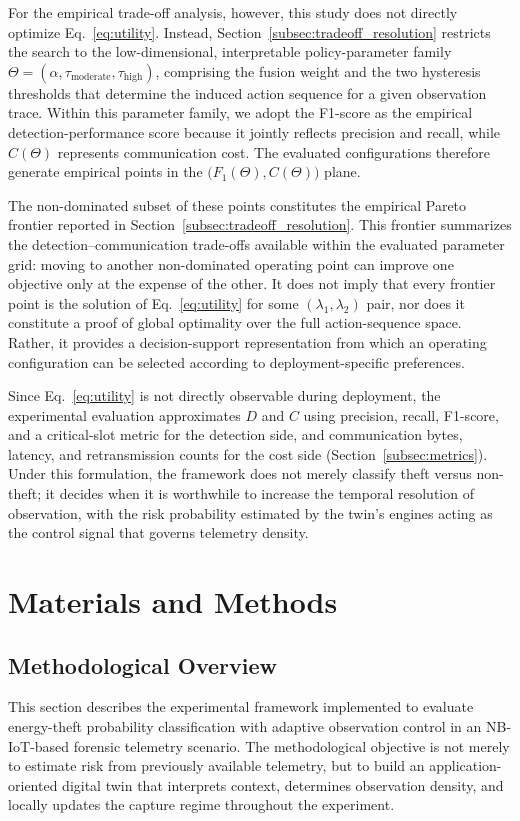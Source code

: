 \documentclass{ieeeaccess}
\begin{document}
For the empirical trade-off analysis, however, this study does not directly optimize Eq.~\eqref{eq:utility}. Instead, Section~\ref{subsec:tradeoff_resolution} restricts the search to the low-dimensional, interpretable policy-parameter family $\Theta=(\alpha,\tau_{\mathrm{moderate}},\tau_{\mathrm{high}})$, comprising the fusion weight and the two hysteresis thresholds that determine the induced action sequence for a given observation trace. Within this parameter family, we adopt the F1-score as the empirical detection-performance score because it jointly reflects precision and recall, while $C(\Theta)$ represents communication cost. The evaluated configurations therefore generate empirical points in the $\bigl(F_1(\Theta),C(\Theta)\bigr)$ plane.

The non-dominated subset of these points constitutes the empirical Pareto frontier reported in Section~\ref{subsec:tradeoff_resolution}. This frontier summarizes the detection--communication trade-offs available within the evaluated parameter grid: moving to another non-dominated operating point can improve one objective only at the expense of the other. It does not imply that every frontier point is the solution of Eq.~\eqref{eq:utility} for some $(\lambda_1,\lambda_2)$ pair, nor does it constitute a proof of global optimality over the full action-sequence space. Rather, it provides a decision-support representation from which an operating configuration can be selected according to deployment-specific preferences.

Since Eq.~\eqref{eq:utility} is not directly observable during deployment, the experimental evaluation approximates $D$ and $C$ using precision, recall, F1-score, and a critical-slot metric for the detection side, and communication bytes, latency, and retransmission counts for the cost side (Section~\ref{subsec:metrics}). Under this formulation, the framework does not merely classify theft versus non-theft; it decides when it is worthwhile to increase the temporal resolution of observation, with the risk probability estimated by the twin's engines acting as the control signal that governs telemetry density.

\section{Materials and Methods}
\label{sec:Materials_Methods}
\subsection{Methodological Overview}
This section describes the experimental framework implemented to evaluate energy-theft probability classification with adaptive observation control in an NB-IoT-based forensic telemetry scenario. The methodological objective is not merely to estimate risk from previously available telemetry, but to build an application-oriented digital twin that interprets context, determines observation density, and locally updates the capture regime throughout the experiment.
\end{document}
